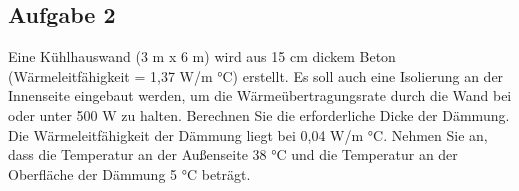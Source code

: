 \documentclass[a4paper,11pt]{article}
\newif\ifshowme
\numberwithin{equation}{section}
\begin{document}
\subsection*{Aufgabe 2}
Eine Kühlhauswand (3 m x 6 m) wird aus 15 cm dickem Beton (Wärmeleitfähigkeit = 1,37
W/m °C) erstellt. Es soll auch eine Isolierung an der Innenseite eingebaut werden, um
die Wärmeübertragungsrate durch die Wand bei oder unter 500 W zu halten. Berechnen
Sie die erforderliche Dicke der Dämmung. Die Wärmeleitfähigkeit der Dämmung liegt bei
0,04 W/m °C. Nehmen Sie an, dass die Temperatur an der Außenseite 38 °C und die
Temperatur an der Oberfläche der Dämmung 5 °C beträgt.
\begin{marginfigure}[-3.5cm]
\centering
{}
\caption{Modell einer Kühlhauswand mit Dämmung}
\end{marginfigure}

\ifshowme%
\marginnote[]{\small Hier ist die Verwendung der richtigen Vorzeichen besonders wichtig. Hätten wir für die Temperatur einen negativen Wert raus, müssten wir auch einen negativen Vorfaktor vor dem Bruch benutzen. Ein falsches Vorzeichen würde tatsächlich auch eine andere Zahl im Ergebnis zur Folge haben.}[2cm]%
%
\antwort{
\begin{align*}
\dot{Q} &= \frac{A \cdot (T_a - T_i)}{\frac{d_2}{\lambda_2} + \frac{d_1}{\lambda_1}} \\
	d_2 &= \lambda_2 \cdot (\frac{A \cdot (T_a - T_i)}{\dot{Q}} - \frac{d_1}{\lambda_1}) \\
	d_2 &= 0,04~ \text{W/m°C} \cdot (\frac{18~\text{m}^2 \cdot ((38-5) \text{°C})}{500~\text{W}} - \frac{0,15~\text{m}}{1,37~ \text{W/m°C} }) \\
	d_2 &= 0,043~\text{m} \rightarrow 4,3~ \text{cm}
\end{align*}
}
\else
\fi
\end{document}
